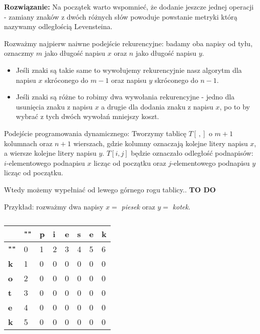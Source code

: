 \textbf{Rozwiązanie:}
Na początek warto wspomnieć, że dodanie jeszcze jednej operacji - 
zamiany znaków z dwóch różnych słów powoduje powstanie metryki
którą nazywamy odległością Levensteina.

Rozważmy najpierw naiwne podejście rekurencyjne: badamy 
oba napisy od tyłu, oznaczmy $m$ jako długość napisu $x$
oraz $n$ jako długość napisu $y$. 
\begin{itemize}
	\item[1.] Jeśli znaki są takie same to wywołujemy rekurencyjnie
	nasz algorytm dla napisu $x$ skróconego do $m - 1$ oraz 
	napisu $y$ skróconego do $n - 1$.
	\item[2.] Jeśli znaki są różne to robimy dwa wywołania 
	rekurencyjne - jedno dla usunięcia znaku z napisu $x$ 
	a drugie dla dodania znaku z napisu $x$, po 
	to by wybrać z tych dwóch wywołań mniejszy koszt.
\end{itemize}


Podejście programowania dynamicznego: Tworzymy tablicę $T[\,,]$ o
$m + 1$ kolumnach oraz $n + 1$ wierszach,
gdzie kolumny oznaczają kolejne litery napisu $x$, a
wiersze kolejne litery napisu $y$. 
$T[i, j]$ będzie oznaczało odległość podnapisów:
$i$-elementowego podnapisu $x$ licząc od początku oraz 
$j$-elementowego podnapisu $y$ licząc od początku.

Wtedy możemy wypełniać od lewego górnego rogu tablicy.. \textbf{TO DO}


Przykład: rozważmy dwa napisy $x =$ \textit{piesek} oraz $y =$ \textit{kotek}.


\begin{table}[H]
	\center
	\begin{tabular}{|l|lllllll|}
		\hline
		& \multicolumn{1}{l|}{\textbf{""}} & \multicolumn{1}{l|}{\textbf{p}} & \multicolumn{1}{l|}{\textbf{i}} & \multicolumn{1}{l|}{\textbf{e}} & \multicolumn{1}{l|}{\textbf{s}} & \multicolumn{1}{l|}{\textbf{e}} & \multicolumn{1}{l|}{\textbf{k}} \\ \hline
		\textbf{""} & 0 & 1 & 2 & 3 & 4 & 5 & 6 \\ \cline{1-1}
		\textbf{k}  & 1 & 0 & 0 & 0 & 0 & 0 & 0 \\ \cline{1-1}
		\textbf{o}  & 2 & 0 & 0 & 0 & 0 & 0 & 0 \\ \cline{1-1}
		\textbf{t}  & 3 & 0 & 0 & 0 & 0 & 0 & 0 \\ \cline{1-1}
		\textbf{e}  & 4 & 0 & 0 & 0 & 0 & 0 & 0 \\ \cline{1-1}
		\textbf{k}  & 5 & 0 & 0 & 0 & 0 & 0 & 0 \\ \cline{1-1}
		\hline
	\end{tabular}
	\caption{}
	\label{tab_zad14}
\end{table}